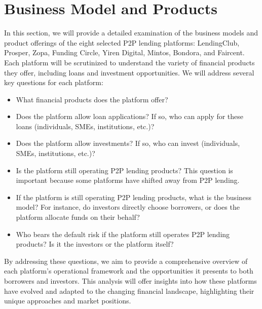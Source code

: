 \documentclass{article}
\begin{document}
\section{Business Model and Products}
In this section, we will provide a detailed examination of the business models and product offerings of the eight selected P2P lending platforms: LendingClub, Prosper, Zopa, Funding Circle, Yiren Digital, Mintos, Bondora, and Faircent. Each platform will be scrutinized to understand the variety of financial products they offer, including loans and investment opportunities. We will address several key questions for each platform:
\begin{itemize}
    \item What financial products does the platform offer?
    \item Does the platform allow loan applications? If so, who can apply for these loans (individuals, SMEs, institutions, etc.)?
    \item Does the platform allow investments? If so, who can invest (individuals, SMEs, institutions, etc.)?
    \item Is the platform still operating P2P lending products? This question is important because some platforms have shifted away from P2P lending.
    \item If the platform is still operating P2P lending products, what is the business model? For instance, do investors directly choose borrowers, or does the platform allocate funds on their behalf?
    \item Who bears the default risk if the platform still operates P2P lending products? Is it the investors or the platform itself?
\end{itemize}
By addressing these questions, we aim to provide a comprehensive overview of each platform's operational framework and the opportunities it presents to both borrowers and investors. This analysis will offer insights into how these platforms have evolved and adapted to the changing financial landscape, highlighting their unique approaches and market positions.
\end{document}
